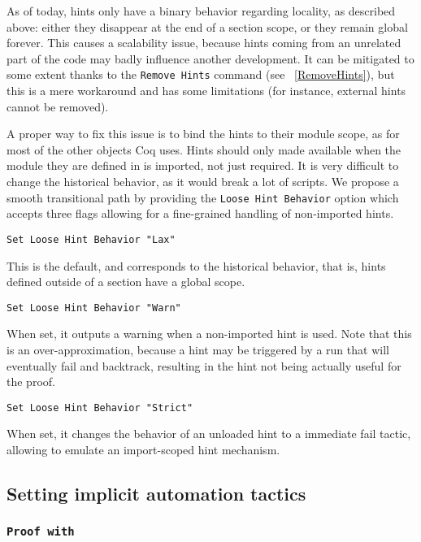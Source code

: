 \begin{coq_example*}
As of today, hints only have a binary behavior regarding locality, as described
above: either they disappear at the end of a section scope, or they remain
global forever. This causes a scalability issue, because hints coming from an
unrelated part of the code may badly influence another development. It can be
mitigated to some extent thanks to the {\tt Remove Hints} command
(see ~\ref{RemoveHints}), but this is a mere workaround and has some
limitations (for instance, external hints cannot be removed).

A proper way to fix this issue is to bind the hints to their module scope, as
for most of the other objects Coq uses. Hints should only made available when
the module they are defined in is imported, not just required. It is very
difficult to change the historical behavior, as it would break a lot of scripts.
We propose a smooth transitional path by providing the {\tt Loose Hint Behavior}
option which accepts three flags allowing for a fine-grained handling of
non-imported hints.

\begin{Variants}

\item {\tt Set Loose Hint Behavior "Lax"}

  This is the default, and corresponds to the historical behavior, that is,
  hints defined outside of a section have a global scope.

\item {\tt Set Loose Hint Behavior "Warn"}

  When set, it outputs a warning when a non-imported hint is used. Note that
  this is an over-approximation, because a hint may be triggered by a run that
  will eventually fail and backtrack, resulting in the hint not being actually
  useful for the proof.

\item {\tt Set Loose Hint Behavior "Strict"}

  When set, it changes the behavior of an unloaded hint to a immediate fail
  tactic, allowing to emulate an import-scoped hint mechanism.

\end{Variants}

\subsection{Setting implicit automation tactics}

\subsubsection{\tt Proof with {\tac}}
\label{ProofWith}


\end{coq_example*}
